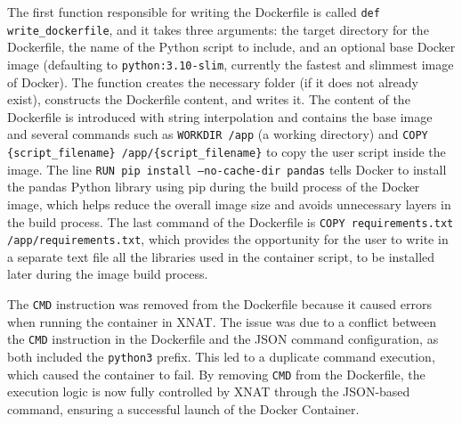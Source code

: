 The first function responsible for writing the Dockerfile is called \texttt{def write\_dockerfile}, and it takes three arguments: the target directory for the Dockerfile, the name of the Python script to include, and an optional base Docker image (defaulting to \texttt{python:3.10-slim}, currently the fastest and slimmest image of Docker). The function creates the necessary folder (if it does not already exist), constructs the Dockerfile content, and writes it. The content of the Dockerfile is introduced with string interpolation and contains the base image and several commands such as \texttt{WORKDIR /app} (a working directory) and \texttt{COPY \{script\_filename\} /app/\{script\_filename\}} to copy the user script inside the image. The line \texttt{RUN pip install --no-cache-dir pandas} tells Docker to install the pandas Python library using pip during the build process of the Docker image, which helps reduce the overall image size and avoids unnecessary layers in the build process. The last command of the Dockerfile is \texttt{COPY requirements.txt /app/requirements.txt}, which provides the opportunity for the user to write in a separate text file all the libraries used in the container script, to be installed later during the image build process.


The \texttt{CMD} instruction was removed from the Dockerfile because it caused errors when running the container in XNAT. The issue was due to a conflict between the \texttt{CMD} instruction in the Dockerfile and the JSON command configuration, as both included the \texttt{python3} prefix. This led to a duplicate command execution, which caused the container to fail. By removing \texttt{CMD} from the Dockerfile, the execution logic is now fully controlled by XNAT through the JSON-based command, ensuring a successful launch of the Docker Container.



\lstset{style=allblack}


\normalsize
\lstset{inputpath=en/content}



